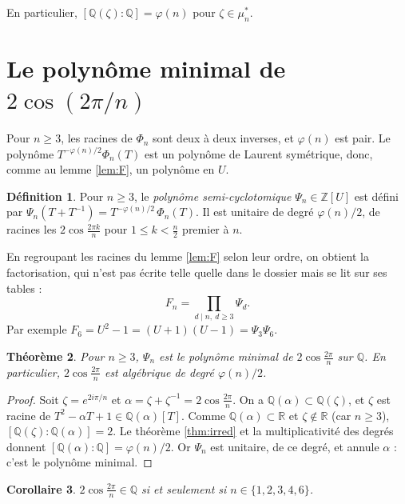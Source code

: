 \documentclass[11pt,a4paper]{article}
\theoremstyle{plain}
\newtheorem{theoreme}{Théorème}[section]
\newtheorem{corollaire}[theoreme]{Corollaire}
\theoremstyle{definition}
\newtheorem{definition}[theoreme]{Définition}
\theoremstyle{remark}
\newcommand{\Z}{\mathbb{Z}}
\newcommand{\Q}{\mathbb{Q}}
\newcommand{\R}{\mathbb{R}}
\begin{document}
En particulier, $[\Q(\zeta):\Q]=\varphi(n)$ pour $\zeta\in\mu_n^*$.

\section{Le polynôme minimal de \texorpdfstring{$2\cos(2\pi/n)$}{2cos(2pi/n)}}

Pour $n\geq3$, les racines de $\Phi_n$ sont deux à deux inverses, et $\varphi(n)$ est pair. Le polynôme $T^{-\varphi(n)/2}\Phi_n(T)$ est un polynôme de Laurent symétrique, donc, comme au lemme \ref{lem:F}, un polynôme en $U$.

\begin{definition}
Pour $n\geq3$, le \emph{polynôme semi-cyclotomique} $\Psi_n\in\Z[U]$ est défini par $\Psi_n(T+T^{-1})=T^{-\varphi(n)/2}\,\Phi_n(T)$. Il est unitaire de degré $\varphi(n)/2$, de racines les $2\cos\frac{2\pi k}n$ pour $1\leq k<\frac n2$ premier à $n$.
\end{definition}

En regroupant les racines du lemme \ref{lem:F} selon leur ordre, on obtient la factorisation, qui n'est pas écrite telle quelle dans le dossier mais se lit sur ses tables :
\[
  F_n=\prod_{d\mid n,\ d\geq3}\Psi_d .
\]
Par exemple $F_6=U^2-1=(U+1)(U-1)=\Psi_3\Psi_6$.

\begin{theoreme}\label{thm:psi}
Pour $n\geq3$, $\Psi_n$ est le polynôme minimal de $2\cos\frac{2\pi}n$ sur $\Q$. En particulier, $2\cos\frac{2\pi}n$ est algébrique de degré $\varphi(n)/2$.
\end{theoreme}

\begin{proof}
Soit $\zeta=e^{2i\pi/n}$ et $\alpha=\zeta+\zeta^{-1}=2\cos\frac{2\pi}n$. On a $\Q(\alpha)\subset\Q(\zeta)$, et $\zeta$ est racine de $T^2-\alpha T+1\in\Q(\alpha)[T]$. Comme $\Q(\alpha)\subset\R$ et $\zeta\notin\R$ (car $n\geq3$), $[\Q(\zeta):\Q(\alpha)]=2$. Le théorème \ref{thm:irred} et la multiplicativité des degrés donnent $[\Q(\alpha):\Q]=\varphi(n)/2$. Or $\Psi_n$ est unitaire, de ce degré, et annule $\alpha$ : c'est le polynôme minimal.
\end{proof}

\begin{corollaire}\label{cor:rationnel}
$2\cos\frac{2\pi}n\in\Q$ si et seulement si $n\in\{1,2,3,4,6\}$.
\end{corollaire}
\end{document}
